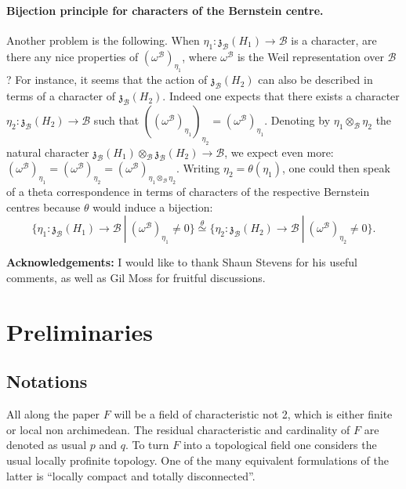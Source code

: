 \documentclass[11pt]{article}
\theoremstyle{plain}
\theoremstyle{definition}
\theoremstyle{plain}
\theoremstyle{definition}
\theoremstyle{plain}
\begin{document}
\paragraph{Bijection principle for characters of the Bernstein centre.} Another problem is the following. When $\eta_1 : \mathfrak{z}_\mathcal{B}(H_1) \to \mathcal{B}$ is a character, are there any nice properties of $(\omega^\mathcal{B})_{\eta_1}$, where $\omega^\mathcal{B}$ is the Weil representation over $\mathcal{B}$? For instance, it seems that the action of $\mathfrak{z}_\mathcal{B}(H_2)$ can also be described in terms of a character of $\mathfrak{z}_\mathcal{B}(H_2)$. Indeed one expects that there exists a character $\eta_2 : \mathfrak{z}_\mathcal{B}(H_2) \to \mathcal{B}$ such that $((\omega^\mathcal{B})_{\eta_1})_{\eta_2} = (\omega^\mathcal{B})_{\eta_1}$. Denoting by $\eta_1 \otimes_\mathcal{B} \eta_2$ the natural character $\mathfrak{z}_\mathcal{B}(H_1) \otimes_\mathcal{B} \mathfrak{z}_\mathcal{B}(H_2) \to \mathcal{B}$, we expect even more: $(\omega^\mathcal{B})_{\eta_1} = (\omega^\mathcal{B})_{\eta_2} = (\omega^\mathcal{B})_{\eta_1 \otimes_\mathcal{B} \eta_2}$. Writing $\eta_2 = \theta(\eta_1)$, one could then speak of a theta correspondence in terms of characters of the respective Bernstein centres because $\theta$ would induce a bijection:
$$\{ \eta_1 : \mathfrak{z}_\mathcal{B}(H_1) \to \mathcal{B} \ | \ (\omega^\mathcal{B})_{\eta_1} \neq 0 \} \overset{\theta}{\simeq} \{ \eta_2 : \mathfrak{z}_\mathcal{B}(H_2) \to \mathcal{B} \ | \ (\omega^\mathcal{B})_{\eta_2} \neq 0 \}.$$


\noindent \textbf{Acknowledgements:} I would like to thank Shaun Stevens for his useful comments, as well as Gil Moss for fruitful discussions.
	

\tableofcontents

\section{Preliminaries}

\subsection{Notations} \label{notations_section}

All along the paper $F$ will be a field of characteristic not 2, which is either finite or local non archimedean. The residual characteristic and cardinality of $F$ are denoted as usual $p$ and $q$. To turn $F$ into a topological field one considers the usual locally profinite topology. One of the many equivalent formulations of the latter is ``locally compact and totally disconnected''.
\end{document}
